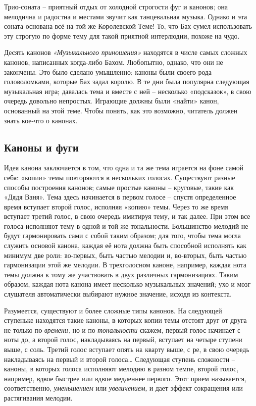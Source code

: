 \documentclass[../main.tex]{subfiles}
\begin{document}
Трио-соната \--- приятный отдых от холодной строгости фуг и канонов; она мелодична и радостна и местами звучит как танцевальная музыка. Однако и эта соната основана всё на той же Королевской Теме! То, что Бах сумел использовать эту строгую по форме тему для такой приятной интерлюдии, похоже на чудо.

Десять канонов \emph{«Музыкального приношения»} находятся в числе самых сложных канонов, написанных когда-либо Бахом. Любопытно, однако, что они не закончены. Это было сделано умышленно; каноны были своего рода головоломками, которые Бах задал королю. В те дни была популярна следующая музыкальная игра; давалась тема и вместе с ней \--- несколько «подсказок», в свою очередь довольно непростых. Играющие должны были «найти» канон, основанный на этой теме. Чтобы понять, как это возможно, читатель должен знать кое-что о канонах.


\subsection{Каноны и фуги}

Идея канона заключается в том, что одна и та же тема играется на фоне самой себя: «копии» темы повторяются в нескольких голосах. Существуют разные способы построения канонов; самые простые каноны \--- круговые, такие как «Дядя Ваня». Тема здесь начинается в первом голосе \--- спустя определенное время вступает второй голос, исполняя «копию» темы. Через то же время вступает третий голос, в свою очередь имитируя тему, и так далее. При этом все голоса исполняют тему в одной и той же тональности. Большинство мелодий не будут гармонировать сами с собой таким образом; для того, чтобы тема могла служить основой канона, каждая её нота должна быть способной исполнять как минимум две роли: во-первых, быть частью мелодии и, во-вторых, быть частью гармонизации этой же мелодии. В трехголосном каноне, например, каждая нота темы должна к тому же участвовать в двух различных гармонизациях. Таким образом, каждая нота канона имеет несколько музыкальных значений; ухо и мозг слушателя автоматически выбирают нужное значение, исходя из контекста.

Разумеется, существуют и более сложные типы канонов. На следующей ступеньке находятся такие каноны, в которых копии темы отстоят друг от друга не только по \emph{времени,} но и по \emph{тональности} скажем, первый голос начинает с ноты до, а второй голос, накладываясь на первый, вступает на четыре ступени выше, с соль. Третий голос вступает опять на кварту выше, с ре, в свою очередь накладываясь на первый и второй голоса\ldots{} Следующая ступень сложности \--- каноны, в которых голоса исполняют мелодию в разном темпе, второй голос, например, вдвое быстрее или вдвое медленнее первого. Этот прием называется, соответственно, \emph{уменьшением} или \emph{увеличением,} и дает эффект сокращения или растягивания мелодии.
\end{document}
